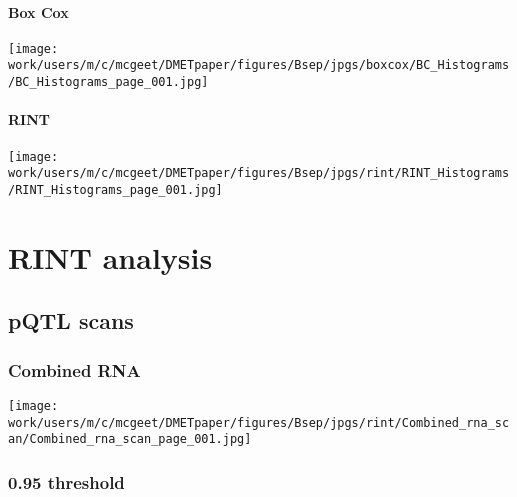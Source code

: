 \documentclass[
  letterpaper,
  DIV=11,
  numbers=noendperiod]{scrreprt}
\begin{document}
\subsubsection{Box Cox}\label{box-cox}

\begin{center}
\texttt{[image: work/users/m/c/mcgeet/DMETpaper/figures/Bsep/jpgs/boxcox/BC\_Histograms/BC\_Histograms\_page\_001.jpg]}
\end{center}

\subsubsection{RINT}\label{rint}

\begin{center}
\texttt{[image: work/users/m/c/mcgeet/DMETpaper/figures/Bsep/jpgs/rint/RINT\_Histograms/RINT\_Histograms\_page\_001.jpg]}
\end{center}


\chapter{RINT analysis}\label{rint-analysis}

\section{pQTL scans}\label{pqtl-scans}

\subsection{Combined RNA}\label{combined-rna}

\begin{center}
\texttt{[image: work/users/m/c/mcgeet/DMETpaper/figures/Bsep/jpgs/rint/Combined\_rna\_scan/Combined\_rna\_scan\_page\_001.jpg]}
\end{center}

\subsection{0.95 threshold}\label{threshold}
\end{document}
